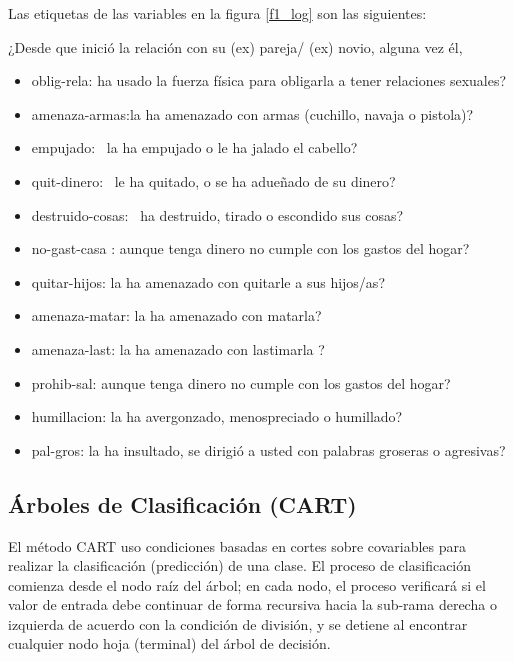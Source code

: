\documentclass[11pt,letter]{article}
\begin{document}
Las etiquetas de las variables en la figura \ref{f1_log} son las siguientes:

¿Desde que inició la relación con su (ex) pareja/ (ex) novio, alguna vez él,						

\begin{itemize}
    \item oblig-rela:  ha usado la fuerza física para obligarla a tener relaciones sexuales?
    \item amenaza-armas:la ha amenazado con armas (cuchillo, navaja o pistola)?
    \item empujado:  la ha empujado o le ha jalado el cabello?
    \item quit-dinero:  le ha quitado, o se ha adueñado de su dinero?
    \item destruido-cosas:  ha destruido, tirado o escondido sus cosas?
    \item no-gast-casa : aunque tenga dinero no cumple con los gastos del hogar?
    \item quitar-hijos:  la ha amenazado con quitarle a sus hijos/as?
    \item amenaza-matar:  la ha amenazado con matarla?
    \item amenaza-last: la ha amenazado con lastimarla ?
    \item prohib-sal: aunque tenga dinero no cumple con los gastos del hogar?
    \item humillacion: la ha avergonzado, menospreciado o humillado?
    \item pal-gros: la ha insultado, se dirigió a usted con palabras groseras o agresivas?
    
\end{itemize}

\subsection{Árboles de Clasificación (CART) }
El método CART uso condiciones basadas en cortes sobre covariables para realizar la clasificación (predicción) de una clase. El proceso de clasificación comienza desde el nodo raíz del árbol; en cada nodo, el proceso verificará si el valor de entrada debe continuar de forma recursiva hacia la sub-rama derecha o izquierda de acuerdo con la condición de división, y se detiene al encontrar cualquier nodo hoja (terminal) del árbol de decisión. \autocite{MinDatR}
\end{document}
